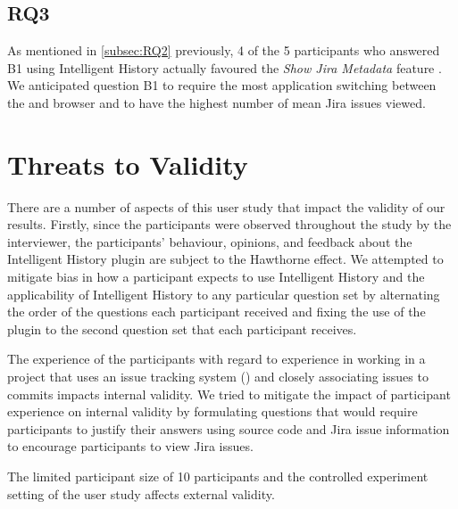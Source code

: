 \subsection{RQ3}
\label{subsec:RQ3}


As mentioned in \autoref{subsec:RQ2} previously, 4 of the 5 participants who answered B1 using Intelligent History actually favoured the \textit{Show Jira Metadata} feature .
We anticipated question B1 to require the most application switching between the  and browser and to have the highest number of mean Jira issues viewed.

\section{Threats to Validity}
\label{sec:Threads-to-Validity}

There are a number of aspects of this user study that impact the validity of our results.
Firstly, since the participants were observed throughout the study by the interviewer, the participants' behaviour, opinions, and feedback about the Intelligent History plugin are subject to the Hawthorne effect.
We attempted to mitigate bias in how a participant expects to use Intelligent History and the applicability of Intelligent History to any particular question set 
by alternating the order of the questions each participant received and 
fixing the use of the plugin to the second question set that each participant receives.

The experience of the participants with regard to experience in working in a project that uses an issue tracking system () and closely associating issues to commits impacts internal validity.
We tried to mitigate the impact of participant experience on internal validity by formulating questions that would require participants to justify their answers using source code and Jira issue information to
encourage participants to view Jira issues.

The limited participant size of 10 participants and the controlled experiment setting of the user study affects external validity.

\endinput

Any text after an \endinput is ignored.
You could put scraps here or things in progress.
